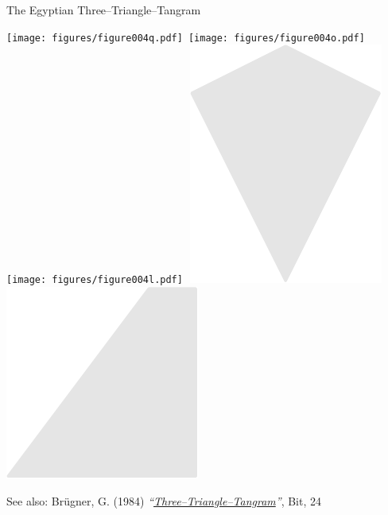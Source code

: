 \documentclass[14pt]{beamer}
\begin{document}
\begin{frame}{The Egyptian Three--Triangle--Tangram}
\begin{center}
            \texttt{[image: figures/figure004q.pdf]}\quad\;\,
            \texttt{[image: figures/figure004o.pdf]}\quad
            \texttt{[image: figures/figure004l.pdf]}\quad\,\,
            \includegraphics[scale=0.240]{figures/figure004j.pdf}\quad\;\,
            \includegraphics[scale=0.240]{figures/figure004g.pdf}\phantom{.}\\

            \bigskip \bigskip

            {\footnotesize See also: Brügner, G. (1984) \emph{``\href{https://doi.org/10.1007/BF02136037}{Three--Triangle--Tangram}''}, Bit, 24}
        \end{center}
    \end{frame}

\end{document}
